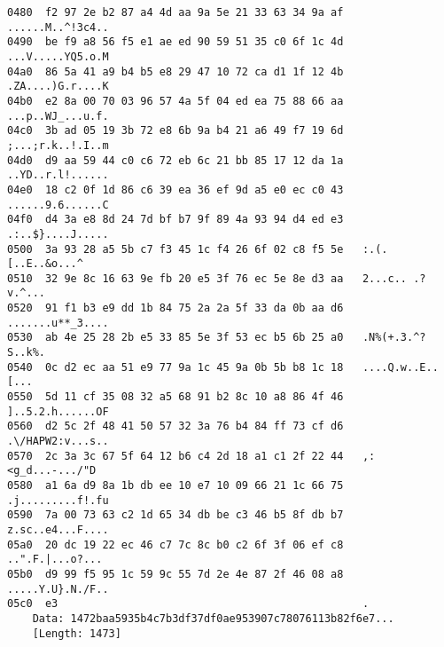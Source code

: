 \begin{lstlisting}
0480  f2 97 2e b2 87 a4 4d aa 9a 5e 21 33 63 34 9a af   ......M..^!3c4..
0490  be f9 a8 56 f5 e1 ae ed 90 59 51 35 c0 6f 1c 4d   ...V.....YQ5.o.M
04a0  86 5a 41 a9 b4 b5 e8 29 47 10 72 ca d1 1f 12 4b   .ZA....)G.r....K
04b0  e2 8a 00 70 03 96 57 4a 5f 04 ed ea 75 88 66 aa   ...p..WJ_...u.f.
04c0  3b ad 05 19 3b 72 e8 6b 9a b4 21 a6 49 f7 19 6d   ;...;r.k..!.I..m
04d0  d9 aa 59 44 c0 c6 72 eb 6c 21 bb 85 17 12 da 1a   ..YD..r.l!......
04e0  18 c2 0f 1d 86 c6 39 ea 36 ef 9d a5 e0 ec c0 43   ......9.6......C
04f0  d4 3a e8 8d 24 7d bf b7 9f 89 4a 93 94 d4 ed e3   .:..$}....J.....
0500  3a 93 28 a5 5b c7 f3 45 1c f4 26 6f 02 c8 f5 5e   :.(.[..E..&o...^
0510  32 9e 8c 16 63 9e fb 20 e5 3f 76 ec 5e 8e d3 aa   2...c.. .?v.^...
0520  91 f1 b3 e9 dd 1b 84 75 2a 2a 5f 33 da 0b aa d6   .......u**_3....
0530  ab 4e 25 28 2b e5 33 85 5e 3f 53 ec b5 6b 25 a0   .N%(+.3.^?S..k%.
0540  0c d2 ec aa 51 e9 77 9a 1c 45 9a 0b 5b b8 1c 18   ....Q.w..E..[...
0550  5d 11 cf 35 08 32 a5 68 91 b2 8c 10 a8 86 4f 46   ]..5.2.h......OF
0560  d2 5c 2f 48 41 50 57 32 3a 76 b4 84 ff 73 cf d6   .\/HAPW2:v...s..
0570  2c 3a 3c 67 5f 64 12 b6 c4 2d 18 a1 c1 2f 22 44   ,:<g_d...-.../"D
0580  a1 6a d9 8a 1b db ee 10 e7 10 09 66 21 1c 66 75   .j.........f!.fu
0590  7a 00 73 63 c2 1d 65 34 db be c3 46 b5 8f db b7   z.sc..e4...F....
05a0  20 dc 19 22 ec 46 c7 7c 8c b0 c2 6f 3f 06 ef c8    ..".F.|...o?...
05b0  d9 99 f5 95 1c 59 9c 55 7d 2e 4e 87 2f 46 08 a8   .....Y.U}.N./F..
05c0  e3                                                .
    Data: 1472baa5935b4c7b3df37df0ae953907c78076113b82f6e7...
    [Length: 1473]
\end{lstlisting}

